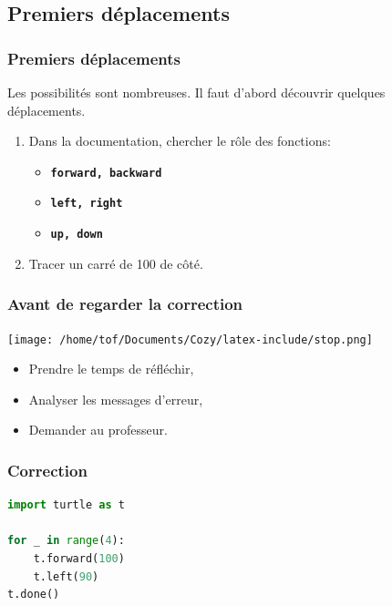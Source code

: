 \documentclass[svgnames,11pt]{beamer}
\begin{document}
\subsection{Premiers déplacements}
\begin{frame}
    \frametitle{Premiers déplacements}

    Les possibilités sont nombreuses. Il faut d'abord découvrir quelques déplacements.
    \begin{activite}
        \begin{enumerate}
        \item Dans la documentation, chercher le rôle des fonctions:
        \begin{itemize}
        \item \texttt{\textbf{forward, backward}}
        \item \texttt{\textbf{left, right}}
        \item \texttt{\textbf{up, down}}
        \end{itemize}
        \item Tracer un carré de 100 de côté.
        \end{enumerate}
        \end{activite}
\end{frame}
\begin{frame}
    \frametitle{Avant de regarder la correction}
\begin{center}
    \centering
    \texttt{[image: /home/tof/Documents/Cozy/latex-include/stop.png]}
    \end{center}
{\Large
    \begin{itemize}
        \item Prendre le temps de réfléchir,
        \item Analyser les messages d'erreur,
        \item Demander au professeur.
    \end{itemize}
}
\end{frame}
\begin{frame}[fragile]
    \frametitle{Correction}

\begin{center}
\begin{lstlisting}[language=Python , basicstyle=\ttfamily\small, xleftmargin=2em, xrightmargin=2em]
import turtle as t

for _ in range(4):
    t.forward(100)
    t.left(90)
t.done()
\end{lstlisting}
\label{CODE}
\end{center}

\end{frame}
\end{document}
